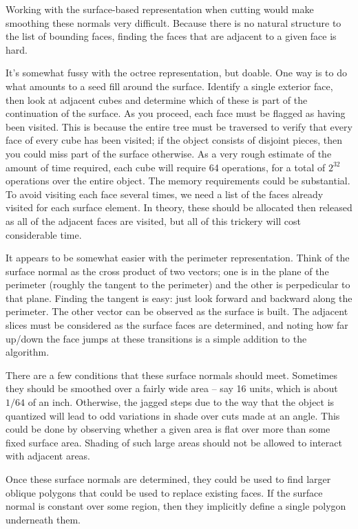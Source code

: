 \documentclass[titlepage,oneside,10pt]{article}
\begin{document}
Working with the surface-based representation when cutting would make
smoothing these normals very difficult. Because there is no natural
structure to the list of bounding faces, finding the faces that are
adjacent to a given face is hard. 

It's somewhat fussy with the octree representation, but doable. One
way is to do what amounts to a seed fill around the surface. Identify
a single exterior face, then look at adjacent cubes and determine
which of these is part of the continuation of the surface. As you
proceed, each face must be flagged as having been visited. This is
because the entire tree must be traversed to verify that every face of
every cube has been visited; if the object consists of disjoint
pieces, then you could miss part of the surface otherwise. As a very
rough estimate of the amount of time required, each cube will require
64 operations, for a total of $2^{32}$ operations over the entire
object. The memory requirements could be substantial. To avoid
visiting each face several times, we need a list of the faces already
visited for each surface element. In theory, these should be allocated
then released as all of the adjacent faces are visited, but all of
this trickery will cost considerable time.

It appears to be somewhat easier with the perimeter
representation. Think of the surface normal as the cross product of
two vectors; one is in the plane of the perimeter (roughly the tangent
to the perimeter) and the other is perpedicular to that plane. Finding
the tangent is easy: just look forward and backward along the
perimeter. The other vector can be observed as the surface is
built. The adjacent slices must be considered as the surface faces are
determined, and noting how far up/down the face jumps at these
transitions is a simple addition to the algorithm.

There are a few conditions that these surface normals should
meet. Sometimes they should be smoothed over a fairly wide area -- say
16 units, which is about $1/64$ of an inch. Otherwise, the jagged
steps due to the way that the object is quantized will lead to odd
variations in shade over cuts made at an angle. This could be done by
observing whether a given area is flat over more than some fixed
surface area. Shading of such large areas should not be allowed to
interact with adjacent areas.

Once these surface normals are determined, they could be used to find
larger oblique polygons that could be used to replace existing
faces. If the surface normal is constant over some region, then they
implicitly define a single polygon underneath them.
\end{document}
